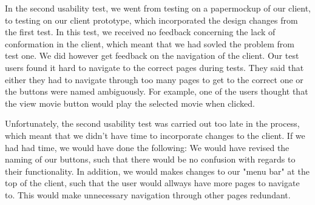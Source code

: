 In the second usability test, we went from testing on a papermockup of our client, to testing on our client prototype, which incorporated the design changes from the first test. In this test, we received no feedback concerning the lack of conformation in the client, which meant that we had sovled the problem from test one. We did however get feedback on the navigation of the client. Our test users found it hard to navigate to the correct pages during tests. They said that either they had to navigate through too many pages to get to the correct one or the buttons were named ambiguously. For example, one of the users thought that the view movie button would play the selected movie when clicked.

Unfortunately, the second usability test was carried out too late in the process, which meant that we didn't have time to incorporate changes to the client. If we had had time, we would have done the following: We would have revised the naming of our buttons, such that there would be no confusion with regards to their functionality. In addition, we would makes changes to our "menu bar" at the top of the client, such that the user would allways have more pages to navigate to. This would make unnecessary navigation through other pages redundant.
